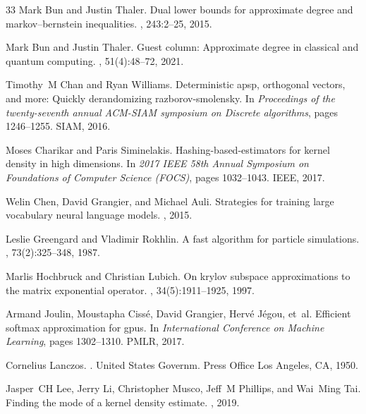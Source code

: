 \begin{thebibliography}{33}
Mark Bun and Justin Thaler.
\newblock Dual lower bounds for approximate degree and markov--bernstein
  inequalities.
, 243:2--25, 2015.

Mark Bun and Justin Thaler.
\newblock Guest column: Approximate degree in classical and quantum computing.
, 51(4):48--72, 2021.

Timothy~M Chan and Ryan Williams.
\newblock Deterministic apsp, orthogonal vectors, and more: Quickly
  derandomizing razborov-smolensky.
\newblock In {\em Proceedings of the twenty-seventh annual ACM-SIAM symposium
  on Discrete algorithms}, pages 1246--1255. SIAM, 2016.

Moses Charikar and Paris Siminelakis.
\newblock Hashing-based-estimators for kernel density in high dimensions.
\newblock In {\em 2017 IEEE 58th Annual Symposium on Foundations of Computer
  Science (FOCS)}, pages 1032--1043. IEEE, 2017.

Welin Chen, David Grangier, and Michael Auli.
\newblock Strategies for training large vocabulary neural language models.
, 2015.

Leslie Greengard and Vladimir Rokhlin.
\newblock A fast algorithm for particle simulations.
, 73(2):325--348, 1987.

Marlis Hochbruck and Christian Lubich.
\newblock On krylov subspace approximations to the matrix exponential operator.
, 34(5):1911--1925, 1997.

Armand Joulin, Moustapha Ciss{\'e}, David Grangier, Herv{\'e} J{\'e}gou, et~al.
\newblock Efficient softmax approximation for gpus.
\newblock In {\em International Conference on Machine Learning}, pages
  1302--1310. PMLR, 2017.

Cornelius Lanczos.
.
\newblock United States Governm. Press Office Los Angeles, CA, 1950.

Jasper~CH Lee, Jerry Li, Christopher Musco, Jeff~M Phillips, and Wai~Ming Tai.
\newblock Finding the mode of a kernel density estimate.
, 2019.


\end{thebibliography}
